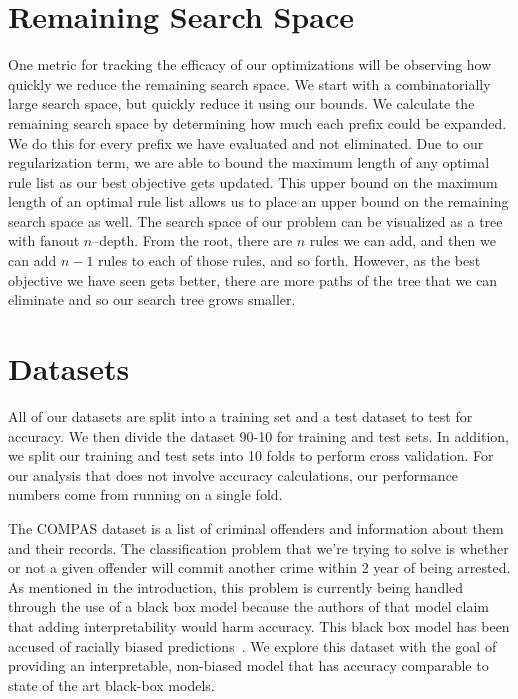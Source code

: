 \section{Remaining Search Space}
One metric for tracking the efficacy of our optimizations will be observing how quickly we reduce the remaining search space.
We start with a combinatorially large search space, but quickly reduce it using our bounds.
We calculate the remaining search space by determining how much each prefix could be expanded.
We do this for every prefix we have evaluated and not eliminated.
Due to our regularization term, we are able to bound the maximum length of any optimal rule list as our best objective gets updated.
This upper bound on the maximum length of an optimal rule list allows us to place an upper bound on the remaining search space as well.
The search space of our problem can be visualized as a tree with fanout $n$--depth.
From the root, there are $n$ rules we can add, and then we can add $n - 1$ rules to each of those rules, and so forth.
However, as the best objective we have seen gets better, there are more paths of the tree that we can eliminate and so our search tree grows smaller.

\section{Datasets}
\label{def:datasets}
All of our datasets are split into a training set and a test dataset to test for accuracy.
We then divide the dataset 90-10 for training and test sets.
In addition, we split our training and test sets into 10 folds to perform cross validation.
For our analysis that does not involve accuracy calculations, our performance numbers come from running on a single fold.

The COMPAS dataset is a list of criminal offenders and information about them and their records.
The classification problem that we're trying to solve is whether or not a given offender will commit another crime within 2 year of being arrested.
As mentioned in the introduction, this problem is currently being handled through the use of a black box model because the authors of that model claim that adding interpretability would harm accuracy.
This black box model has been accused of racially biased predictions~\cite{LarsonMaKiAn16}.
We explore this dataset with the goal of providing an interpretable, non-biased model that has accuracy comparable to state of the art black-box models.


